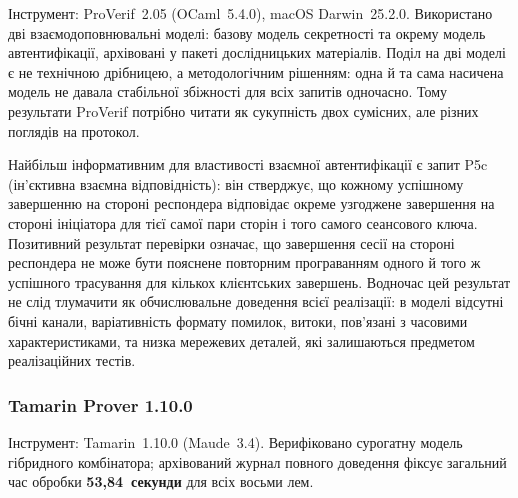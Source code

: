 \documentclass{llncs}
\begin{document}
Інструмент: ProVerif~2.05 (OCaml~5.4.0), macOS Darwin~25.2.0. Використано
дві взаємодоповнювальні моделі: базову модель секретності та окрему
модель автентифікації, архівовані у пакеті дослідницьких матеріалів.
Поділ на дві моделі є не технічною дрібницею, а методологічним
рішенням: одна й та сама насичена модель не давала стабільної збіжності
для всіх запитів одночасно. Тому результати ProVerif потрібно читати як
сукупність двох сумісних, але різних поглядів на протокол.

Найбільш інформативним для властивості взаємної автентифікації є запит
P5c (ін'єктивна взаємна відповідність): він стверджує, що кожному
успішному завершенню на стороні респондера відповідає окреме узгоджене
завершення на стороні ініціатора для тієї самої пари сторін і того
самого сеансового ключа. Позитивний результат перевірки означає, що
завершення сесії на стороні
респондера не може бути пояснене повторним програванням одного й того ж
успішного трасування для кількох клієнтських завершень. Водночас цей
результат не слід тлумачити як обчислювальне доведення всієї реалізації:
в моделі відсутні бічні канали, варіативність формату помилок,
витоки, пов'язані з часовими характеристиками, та низка мережевих деталей, які залишаються предметом
реалізаційних тестів.

\subsubsection{Tamarin Prover 1.10.0}

Інструмент: Tamarin~1.10.0 (Maude~3.4). Верифіковано сурогатну модель
гібридного комбінатора; архівований журнал повного доведення фіксує
загальний час обробки \textbf{53,84~секунди} для всіх восьми лем.
\end{document}
